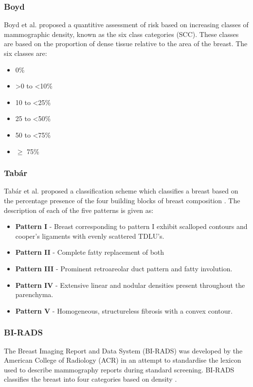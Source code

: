 \subsubsection{Boyd}
Boyd et al. \cite{boyd1995quantitative} proposed a quantitive assessment of risk based on increasing classes of mammographic density, known as the six class categories (SCC). These classes are based on the proportion of dense tissue relative to the area of the breast. The six classes are:

\begin{itemize}
	\item 0\%
	\item \textgreater 0 to \textless 10\% 
	\item 10 to \textless 25\% 
	\item 25 to \textless 50\%
	\item 50 to \textless 75\%
	\item $\geq$ 75\%
\end{itemize}

\subsubsection{Tab\'{a}r}
Tab\'{a}r et al. \cite{gram1997tabar} proposed a classification scheme which classifies a breast based on the percentage presence of the four building blocks of breast composition \cite{gram1997tabar, tabar2005breast}. The description of each of the five patterns is given as:

\begin{itemize}
	\item \textbf{Pattern I} - Breast corresponding to pattern I exhibit scalloped contours and cooper's ligaments with evenly scattered TDLU's.
	\item \textbf{Pattern II} - Complete fatty replacement of both
	\item \textbf{Pattern III} - Prominent retroareolar duct pattern and fatty involution.
	\item \textbf{Pattern IV} - Extensive linear and nodular densities present throughout the parenchyma.
	\item \textbf{Pattern V} - Homogeneous, structureless fibrosis with a convex contour.
\end{itemize}

\subsubsection{BI-RADS}
The Breast Imaging Report and Data System (BI-RADS) \cite{balleyguier2007birads} was developed by the American College of Radiology (ACR) in an attempt to standardise the lexicon used to describe mammography reports during standard screening. BI-RADS classifies the breast into four categories based on density \cite{balleyguier2007birads}.


